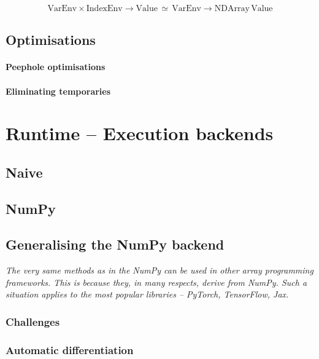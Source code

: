 $$ \mathrm{VarEnv} \times \mathrm{IndexEnv} \to \mathrm{Value} \,\simeq\, \mathrm{VarEnv} \to \mathrm{NDArray}\, \mathrm{Value} $$

\todothis


\subsection{Optimisations}

\todothis

\paragraph{Peephole optimisations}

\paragraph{Eliminating temporaries}

\section{Runtime -- Execution backends}

\subsection{Naive}

\todothis 

\subsection{NumPy}

\todothis 

\subsection{Generalising the NumPy backend}

\textit{The very same methods as in the NumPy can be used in other array programming frameworks. This is because they, in many respects, derive from NumPy. Such a situation applies to the most popular libraries -- PyTorch, TensorFlow, Jax.} \todothis

\subsubsection{Challenges}

\subsubsection{Automatic differentiation}

